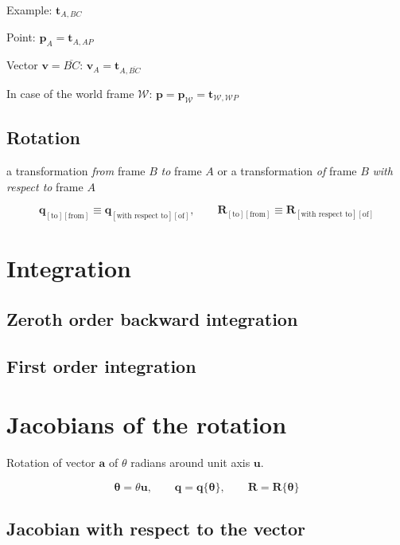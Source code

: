 \documentclass[11pt,a4paper]{scrartcl}
\renewcommand\vec{\bm}
\newcommand{\quat}[1]{\mathbf{#1}}
\newcommand{\Matrix}[1]{\mathbf{#1}}
\begin{document}
Example: $\vec{t}_{A,BC}$

Point: $\vec{p}_A = \vec{t}_{A,AP}$

Vector $\vec{v} = \overline{BC}$: $\vec{v}_A = \vec{t}_{A,\overline{BC}}$

In case of the world frame $\mathcal{W}$: $\vec{p} = \vec{p}_\mathcal{W} = \vec{t}_{\mathcal{W}, \mathcal{W} P}$

\subsection{Rotation}

a transformation \textit{from} frame $B$ \textit{to} frame $A$ or a transformation \textit{of} frame $B$ \textit{with respect to} frame $A$

\begin{equation}
	\quat{q}_{[\text{to}][\text{from}]}
	\equiv
	\quat{q}_{[\text{with respect to}][\text{of}]},
	\qquad
	\Matrix{R}_{[\text{to}][\text{from}]}
	\equiv
	\Matrix{R}_{[\text{with respect to}][\text{of}]}
\end{equation}

\section{Integration}

\subsection{Zeroth order backward integration}

\subsection{First order integration}

\section{Jacobians of the rotation}

Rotation of vector $\vec{a}$ of $\theta$ radians around unit axis $\vec{u}$.

\begin{equation}
	\vec{\theta} = \theta \vec{u},
	\qquad
	\quat{q} = \quat{q}\lbrace \vec{\theta} \rbrace,
	\qquad
	\Matrix{R} = \Matrix{R}\lbrace \vec{\theta} \rbrace
\end{equation}

\subsection{Jacobian with respect to the vector}
\end{document}

